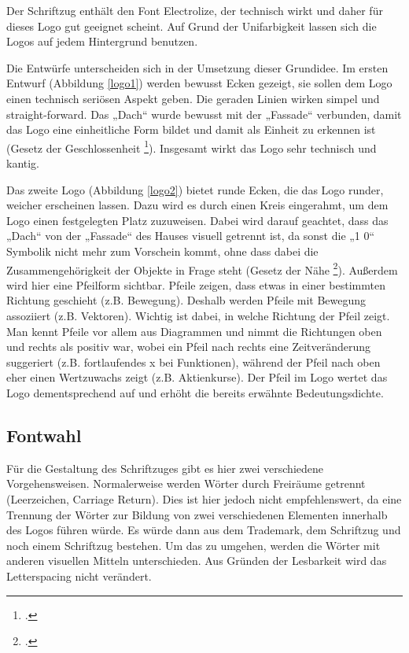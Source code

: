 Der Schriftzug enthält den Font Electrolize, der technisch wirkt und daher für dieses Logo gut geeignet scheint. Auf Grund der Unifarbigkeit lassen sich die Logos auf jedem Hintergrund benutzen.


Die Entwürfe unterscheiden sich in der Umsetzung dieser Grundidee. Im ersten Entwurf (Abbildung \ref{logo1}) werden bewusst Ecken gezeigt, sie sollen dem Logo einen technisch seriösen Aspekt geben. Die geraden Linien wirken simpel und straight-forward. Das „Dach“ wurde bewusst mit der „Fassade“ verbunden, damit das Logo eine einheitliche Form bildet und damit als Einheit zu erkennen ist (Gesetz der Geschlossenheit \footcite[vgl.][]{gestalt}). Insgesamt wirkt das Logo sehr technisch und kantig.


Das zweite Logo (Abbildung \ref{logo2}) bietet runde Ecken, die das Logo runder, weicher erscheinen lassen. Dazu wird es durch einen Kreis eingerahmt, um dem Logo einen festgelegten Platz zuzuweisen. Dabei wird darauf geachtet, dass das „Dach“ von der „Fassade“ des Hauses visuell getrennt ist, da sonst die „1 0“ Symbolik nicht mehr zum Vorschein kommt, ohne dass dabei die Zusammengehörigkeit der Objekte in Frage steht (Gesetz der Nähe \footcite[vgl.][]{gestalt}). Außerdem wird hier eine Pfeilform sichtbar. Pfeile zeigen, dass etwas in einer bestimmten Richtung geschieht (z.B. Bewegung). Deshalb werden Pfeile mit Bewegung assoziiert (z.B. Vektoren). Wichtig ist dabei, in welche Richtung der Pfeil zeigt. Man kennt Pfeile vor allem aus Diagrammen und nimmt die Richtungen oben und rechts als positiv war, wobei ein Pfeil nach rechts eine Zeitveränderung suggeriert (z.B. fortlaufendes x bei Funktionen), während der Pfeil nach oben eher einen Wertzuwachs zeigt (z.B. Aktienkurse). Der Pfeil im Logo wertet das Logo dementsprechend auf und erhöht die bereits erwähnte Bedeutungsdichte.

\subsection{Fontwahl}
Für die Gestaltung des Schriftzuges gibt es hier zwei verschiedene Vorgehensweisen. Normalerweise werden Wörter durch Freiräume getrennt (Leerzeichen, Carriage Return). Dies ist hier jedoch nicht empfehlenswert, da eine Trennung der Wörter zur Bildung von zwei verschiedenen Elementen innerhalb des Logos führen würde. Es würde dann aus dem Trademark, dem Schriftzug und noch einem Schriftzug bestehen. Um das zu umgehen, werden die Wörter mit anderen visuellen Mitteln unterschieden. Aus Gründen der Lesbarkeit wird das Letterspacing nicht verändert.

